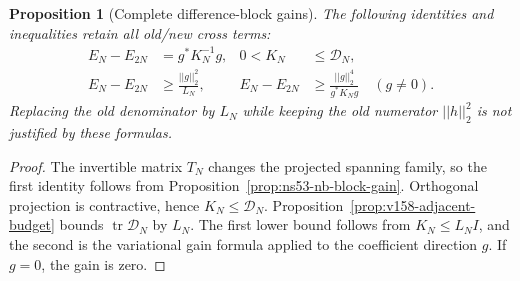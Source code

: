 \documentclass[11pt]{article}
\def\norm#1{||#1||}%
\newtheorem{proposition}[theorem]{Proposition}
\theoremstyle{remark}
\newcommand{\norm}[1]{\left\lVert #1\right\rVert}
\begin{document}
\begin{proposition}[Complete difference-block gains]
\label{prop:v158-difference-gain}
The following identities and inequalities retain all old/new cross terms:
\begin{align}
 E_N-E_{2N}&=g^*K_N^{-1}g, & 0<K_N&\leq\mathcal D_N,
 \label{eq:v158-exact-difference-gain}\\
 E_N-E_{2N}&\geq\frac{\norm{g}_2^2}{L_N},&
 E_N-E_{2N}&\geq
 \frac{\norm{g}_2^4}{g^*K_Ng}\quad(g\ne0).
 \label{eq:v158-difference-bounds}
\end{align}
Replacing the old denominator by $L_N$ while keeping the old numerator
$\norm{h}_2^2$ is not justified by these formulas.
\end{proposition}
\begin{proof}
The invertible matrix $T_N$ changes the projected spanning family, so the
first identity follows from Proposition~\ref{prop:ns53-nb-block-gain}.
Orthogonal projection is contractive, hence $K_N\leq\mathcal D_N$.
Proposition~\ref{prop:v158-adjacent-budget} bounds
$\operatorname{tr}\mathcal D_N$ by $L_N$. The first lower bound follows
from $K_N\leq L_N I$, and the second is the variational gain formula
applied to the coefficient direction $g$. If $g=0$, the gain is zero.
\end{proof}
\end{document}

